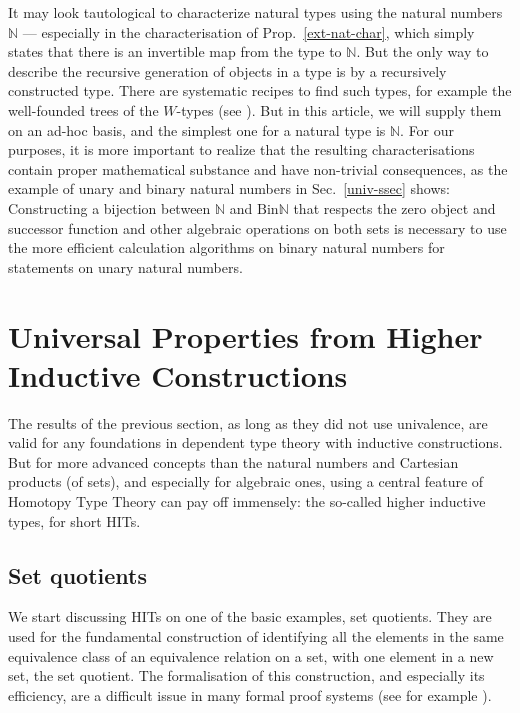 \documentclass{amsart}
\theoremstyle{plain}
\numberwithin{equation}{section} %
\numberwithin{figure}{section} %
\theoremstyle{plain}
\theoremstyle{plain}
\theoremstyle{plain}
\theoremstyle{plain}
\theoremstyle{plain}
\theoremstyle{plain}
\theoremstyle{remark}
\theoremstyle{remark}
\theoremstyle{remark}
\begin{document}
It may look tautological to characterize natural types using the natural numbers $\mathbb{N}$ --- especially in the characterisation of Prop.~\ref{ext-nat-char}, which simply states that there is an invertible map from the type to $\mathbb{N}$. 
But the only way to describe the recursive generation of objects in a type is by a recursively constructed type. There are systematic recipes to find such types, for example the well-founded trees of the $W$-types (see \cite[5.3]{HoTTBook}). But in this article, we will supply them on an ad-hoc basis, and the simplest one for a natural type is $\mathbb{N}$. For our purposes, it is more important to realize that the resulting characterisations contain proper mathematical substance and have non-trivial consequences, as the example of unary and binary natural numbers in Sec.~\ref{univ-ssec} shows: Constructing a bijection between $\mathbb{N}$ and $\mathrm{Bin}\mathbb{N}$ that respects the zero object and successor function and other algebraic operations on both sets is necessary to use the more efficient calculation algorithms on binary natural numbers for statements on unary natural numbers.   


\section{Universal Properties from Higher Inductive Constructions}

The results of the previous section, as long as they did not use univalence, are valid for any foundations in dependent type theory with inductive constructions. But for more advanced concepts than the natural numbers and Cartesian products (of sets), and especially for algebraic ones, using a central feature of Homotopy Type Theory can pay off immensely: the so-called higher inductive types, for short HITs. 

\subsection{Set quotients}  \label{set-quot-ssec}

We start discussing HITs on one of the basic examples, set quotients. They are used for the fundamental construction of identifying all the elements in the same equivalence class of an equivalence relation on a set, with one element in a new set, the set quotient. The formalisation of this construction, and especially its efficiency, are a difficult issue in many formal proof systems (see for example \cite{Setoid}). 
\end{document}
